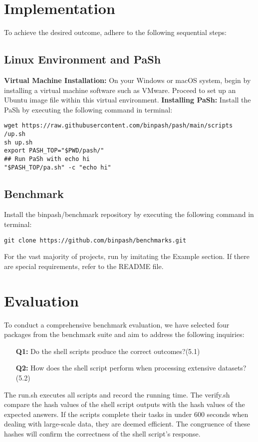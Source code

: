 \documentclass[sigplan, screen, 10pt]{acmart}
\begin{document}
\section{Implementation}
\label{tec}
To achieve the desired outcome, adhere to the following sequential steps:
\subsection{Linux Environment and PaSh}
\textbf{Virtual Machine Installation:} On your Windows or macOS system, begin by installing a virtual machine software such as VMware. Proceed to set up an Ubuntu image file within this virtual environment.\newline
\textbf{Installing PaSh:} Install the PaSh by executing the following command in terminal\cite{vasilakis2021pash}:
\begin{verbatim}
wget https://raw.githubusercontent.com/binpash/pash/main/scripts
/up.sh
sh up.sh
export PASH_TOP="$PWD/pash/"
## Run PaSh with echo hi
"$PASH_TOP/pa.sh" -c "echo hi"
\end{verbatim}
\subsection{Benchmark}
Install the binpash/benchmark repository by executing the following command in terminal:
\begin{verbatim}
git clone https://github.com/binpash/benchmarks.git
\end{verbatim}
For the vast majority of projects, run by imitating the Example section.
If there are special requirements, refer to the README file.


\section{Evaluation}
\label{eval}
To conduct a comprehensive benchmark evaluation, we have selected four packages from the benchmark suite and aim to address the following inquiries:
\begin{itemize}
\item[\textbf{Q1:}] Do the shell scripts produce the correct outcomes?(5.1)
\item[\textbf{Q2:}] How does the shell script perform when processing extensive datasets?(5.2)
\end{itemize}
The run.sh executes all scripts and record the running time.
The verify.sh compare the hash values of the shell script outputs with the hash values of the expected answers\cite{manankova2022cryptanalysis}.
If the scripts complete their tasks in under 600 seconds when dealing with large-scale data, they are deemed efficient.
The congruence of these hashes will confirm the correctness of the shell script's response.
\end{document}
